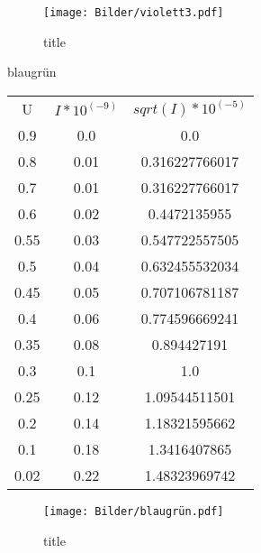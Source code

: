 \begin{figure}
  \centering
  \caption{title}
  \label{fig:jakdwewwfn}
  \texttt{[image: Bilder/violett3.pdf]}
\end{figure}


blaugrün

\begin{table}
\begin{tabular}{ccc}
U & $I*10^(-9)$ & $sqrt(I)*10^(-5)$ \\
0.9 & 0.0 & 0.0 \\
0.8 & 0.01 & 0.316227766017 \\
0.7 & 0.01 & 0.316227766017 \\
0.6 & 0.02 & 0.4472135955 \\
0.55 & 0.03 & 0.547722557505 \\
0.5 & 0.04 & 0.632455532034 \\
0.45 & 0.05 & 0.707106781187 \\
0.4 & 0.06 & 0.774596669241 \\
0.35 & 0.08 & 0.894427191 \\
0.3 & 0.1 & 1.0 \\
0.25 & 0.12 & 1.09544511501 \\
0.2 & 0.14 & 1.18321595662 \\
0.1 & 0.18 & 1.3416407865 \\
0.02 & 0.22 & 1.48323969742 \\
\end{tabular}
\end{table}


\begin{figure}
  \centering
  \caption{title}
  \label{fig:jakdfewwn}
  \texttt{[image: Bilder/blaugrün.pdf]}
\end{figure}
